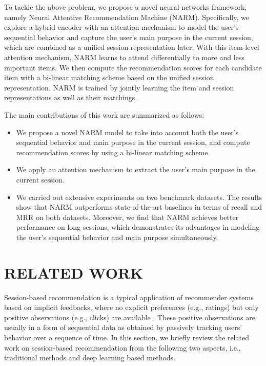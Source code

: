 \documentclass[sigconf]{acmart}
\begin{document}
To tackle the above problem, we propose a novel neural networks framework, namely Neural Attentive Recommendation Machine (NARM). Specifically, we explore a hybrid encoder with an attention mechanism to model the user's sequential behavior and capture the user's main purpose in the current session, which are combined as a unified session representation later. With this item-level attention mechanism, NARM learns to attend differentially to more and less important items. We then compute the recommendation scores for each candidate item with a bi-linear matching scheme based on the unified session representation. NARM is trained by jointly learning the item and session representations as well as their matchings.


\noindent The main contributions of this work are summarized as follows:
 \begin{itemize}
\item We propose a novel NARM model to take into account both the user's sequential behavior and main purpose in the current session, and compute recommendation scores by using a bi-linear matching scheme. 
\item We apply an attention mechanism to extract the user's main purpose in the current session. 
\item We carried out extensive experiments on two benchmark datasets. The results show that NARM outperforms state-of-the-art baselines in terms of recall and MRR on both datasets. Moreover, we find that NARM achieves better performance on long sessions, which demonstrates its advantages in modeling the user's sequential behavior and main purpose simultaneously.
\end{itemize}

\section{RELATED WORK}

Session-based recommendation is a typical application of recommender systems based on implicit feedbacks, where no explicit preferences (e.g., ratings) but only positive observations (e.g., clicks) are available \cite{mild2003improved,he2016fast,ren2017social}. These positive observations are usually in a form of sequential data as obtained by passively tracking users' behavior over a sequence of time. In this section, we briefly review the related work on session-based recommendation from the following two aspects, i.e., traditional methods and deep learning based methods.
  
\end{document}
